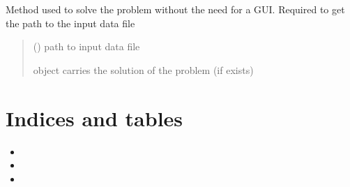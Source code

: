 \documentclass[letterpaper,10pt,english]{sphinxmanual}
\begin{document}

\begin{fulllineitems}
\label{\detokenize{main:main.rapidSolver}}
\pysigstartsignatures
{}
\pysigstopsignatures
\sphinxAtStartPar
Method used to solve the problem without the need for a GUI.
Required to get the path to the input data file
\begin{quote}\begin{description}
\sphinxAtStartPar
{} () \textendash{} path to input data file

\sphinxAtStartPar
object carries the solution of the problem (if exists)

\sphinxAtStartPar
{\hyperref[\detokenize{board_resolver:board_resolver.BoardResolver}]{}}

\end{description}\end{quote}

\end{fulllineitems}


\begin{fulllineitems}
\label{\detokenize{main:main.guiMain}}
\pysigstartsignatures
{}
\pysigstopsignatures
\end{fulllineitems}



\chapter{Indices and tables}
\label{\detokenize{index:indices-and-tables}}\begin{itemize}
\item {} 
\sphinxAtStartPar
{}

\item {} 
\sphinxAtStartPar
{}

\item {} 
\sphinxAtStartPar
{}

\end{itemize}
\end{document}
